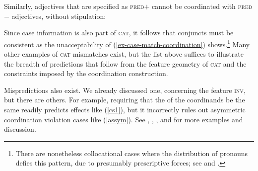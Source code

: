 \documentclass[output=paper
                ,modfonts
                ,nonflat
	        ,collection
	        ,collectionchapter
	        ,collectiontoclongg
 	        ,biblatex
                ,babelshorthands
                ,newtxmath
                ,draftmode
                ,colorlinks, citecolor=brown
]{./langsci/langscibook}
\begin{document}
{
\zl

Similarly, adjectives that are specified as \textsc{pred}$+$ cannot be
coordinated with  \textsc{pred}$-$ adjectives, without stipulation:

\eal
{}
\zl


\noindent
Since case information is also part of \textsc{cat}, it follows that conjuncts must be consistent as the unacceptability of  (\ref{ex-case-match-coordination}) shows.\footnote{There are nonetheless collocational cases where the distribution of pronouns defies this pattern, due to presumably prescriptive forces; see \citet{grano} and \citet{binomial}.}
 Many other examples of \textsc{cat} mismatches exist, but the  list above suffices to
illustrate the breadth of predictions that follow from the feature geometry of \textsc{cat} and the constraints imposed by
the coordination construction.

\eal
\label{ex-case-match-coordination}
\zl




Mispredictions also exist. We already discussed one, concerning the feature \textsc{inv}, but there are others. For example, requiring that the \slashv of the coordinands be the same readily predicts  effects like 
(\ref{cs1}), but it incorrectly rules out asymmetric coordination violation cases like (\ref{assym}). 
See \citet{goldsmith}, \citet{lakoff86}, \citet{levinprince86}, and \citet{kehler} for more examples and discussion.


\begin{exe}
\ex \begin{xlista}


\end{xlista}
\end{exe}}
\end{document}
